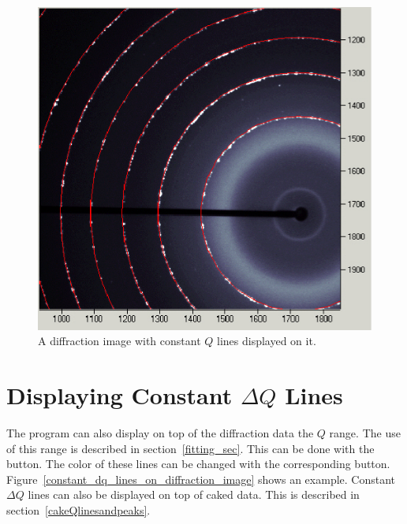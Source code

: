 \begin{figure}
    \centering
    \includegraphics[scale=.75]
        {figures/constant_q_lines_on_diffraction_image.eps}
    \caption{A diffraction image with constant 
    $Q$ lines displayed on it.}
    \label{constant_q_lines_on_diffraction_image}
\end{figure}

\section{\texorpdfstring{Displaying Constant $\Delta Q$ 
    Lines}{Displaying Constant delta Q Lines}}
    \label{displayconstdQlines}

The program can also display on top of the diffraction
data the $Q$ range. The use of this range is 
described in section~\ref{fitting_sec}. 
This can be done with the  button.
The color of these lines can be changed with the
corresponding  button. 
Figure~\ref{constant_dq_lines_on_diffraction_image}
shows an example.
Constant $\Delta Q$ lines can also be displayed on top 
of caked data. This is described in 
section~\ref{cakeQlinesandpeaks}.

